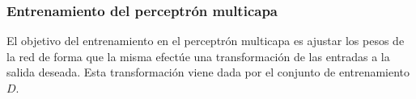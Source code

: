 \documentclass[12pt,bibliography=oldstyle,DIV=12,parskip=half-]{scrreprt}
\begin{document}





















%
\subsubsection{Entrenamiento del perceptrón multicapa}
%
El objetivo del entrenamiento en el perceptrón multicapa es ajustar
los pesos de la red de forma que la misma efectúe una transformación
de las entradas a la salida deseada. Esta transformación viene dada
por el conjunto de entrenamiento $D$.
\end{document}
